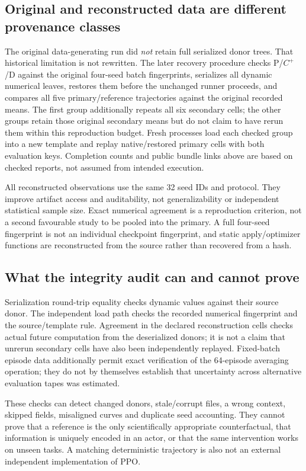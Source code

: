 \subsection{Original and reconstructed data are different provenance classes}
The original data-generating run did \emph{not} retain full serialized donor trees. That historical limitation is not rewritten. The later recovery procedure checks P/$C^+$/D against the original four-seed batch fingerprints, serializes all dynamic numerical leaves, restores them before the unchanged runner proceeds, and compares all five primary/reference trajectories against the original recorded means. The first group additionally repeats all six secondary cells; the other groups retain those original secondary means but do not claim to have rerun them within this reproduction budget. Fresh processes load each checked group into a new template and replay native/restored primary cells with both evaluation keys. Completion counts and public bundle links above are based on checked reports, not assumed from intended execution.

All reconstructed observations use the same 32 seed IDs and protocol. They improve artifact access and auditability, not generalizability or independent statistical sample size. Exact numerical agreement is a reproduction criterion, not a second favourable study to be pooled into the primary. A full four-seed fingerprint is not an individual checkpoint fingerprint, and static apply/optimizer functions are reconstructed from the source rather than recovered from a hash.

\subsection{What the integrity audit can and cannot prove}
Serialization round-trip equality checks dynamic values against their source donor. The independent load path checks the recorded numerical fingerprint and the source/template rule. Agreement in the declared reconstruction cells checks actual future computation from the deserialized donors; it is not a claim that unrerun secondary cells have also been independently replayed. Fixed-batch episode data additionally permit exact verification of the 64-episode averaging operation; they do not by themselves establish that uncertainty across alternative evaluation tapes was estimated.

These checks can detect changed donors, stale/corrupt files, a wrong context, skipped fields, misaligned curves and duplicate seed accounting. They cannot prove that a reference is the only scientifically appropriate counterfactual, that information is uniquely encoded in an actor, or that the same intervention works on unseen tasks. A matching deterministic trajectory is also not an external independent implementation of PPO.

